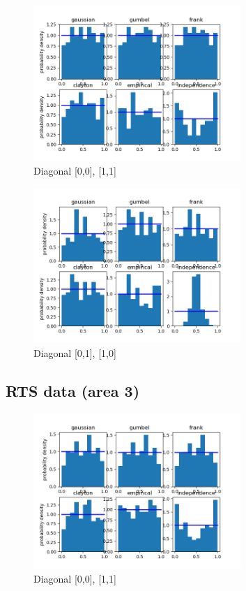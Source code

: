 

\begin{figure}[h]
	\centering
	\includegraphics[width=0.7\textwidth]{2016-12-24_08_00-2016-12-24_09_00-0.png}
	\caption{Diagonal [0,0], [1,1]}
\end{figure}

\begin{figure}[h]
	\centering
	\includegraphics[width=0.7\textwidth]{2016-12-24_08_00-2016-12-24_09_00-1.png}
	\caption{Diagonal [0,1], [1,0]}
\end{figure}

\clearpage

\subsection{RTS data (area 3)}



\begin{figure}[h]
	\centering
	\includegraphics[width=0.7\textwidth]{RTS/2020-02-18_06_00-2020-02-18_07_00-0.png}
	\caption{Diagonal [0,0], [1,1]}
\end{figure}


